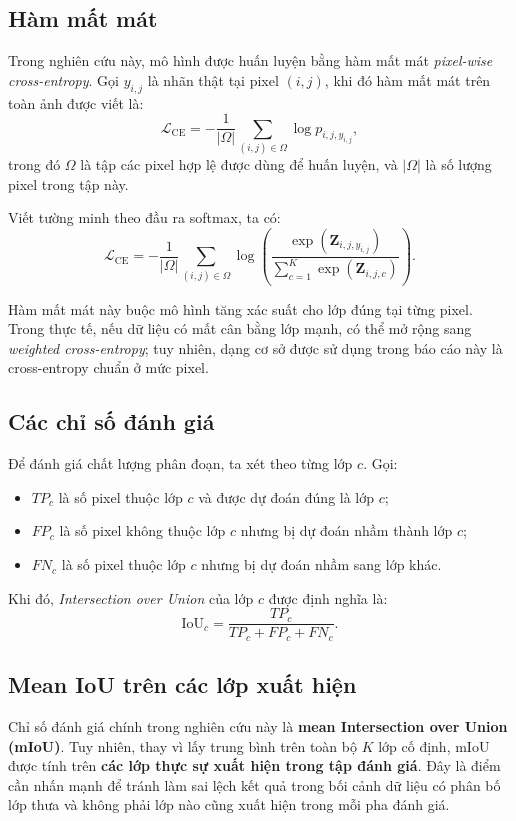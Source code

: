 \subsection{Hàm mất mát}

Trong nghiên cứu này, mô hình được huấn luyện bằng hàm mất mát \textit{pixel-wise cross-entropy}. Gọi $y_{i,j}$ là nhãn thật tại pixel $(i,j)$, khi đó hàm mất mát trên toàn ảnh được viết là:
\[
\mathcal{L}_{\mathrm{CE}}
=
-\frac{1}{|\Omega|}
\sum_{(i,j)\in\Omega}
\log p_{i,j,y_{i,j}},
\]
trong đó $\Omega$ là tập các pixel hợp lệ được dùng để huấn luyện, và $|\Omega|$ là số lượng pixel trong tập này.

Viết tường minh theo đầu ra softmax, ta có:
\[
\mathcal{L}_{\mathrm{CE}}
=
-\frac{1}{|\Omega|}
\sum_{(i,j)\in\Omega}
\log
\left(
\frac{\exp(\mathbf{Z}_{i,j,y_{i,j}})}
{\sum_{c=1}^{K}\exp(\mathbf{Z}_{i,j,c})}
\right).
\]

Hàm mất mát này buộc mô hình tăng xác suất cho lớp đúng tại từng pixel. Trong thực tế, nếu dữ liệu có mất cân bằng lớp mạnh, có thể mở rộng sang \textit{weighted cross-entropy}; tuy nhiên, dạng cơ sở được sử dụng trong báo cáo này là cross-entropy chuẩn ở mức pixel.

\subsection{Các chỉ số đánh giá}

Để đánh giá chất lượng phân đoạn, ta xét theo từng lớp $c$. Gọi:
\begin{itemize}[leftmargin=1.5em]
    \item $TP_c$ là số pixel thuộc lớp $c$ và được dự đoán đúng là lớp $c$;
    \item $FP_c$ là số pixel không thuộc lớp $c$ nhưng bị dự đoán nhầm thành lớp $c$;
    \item $FN_c$ là số pixel thuộc lớp $c$ nhưng bị dự đoán nhầm sang lớp khác.
\end{itemize}

Khi đó, \textit{Intersection over Union} của lớp $c$ được định nghĩa là:
\[
\mathrm{IoU}_c = \frac{TP_c}{TP_c + FP_c + FN_c}.
\]

\subsection{Mean IoU trên các lớp xuất hiện}

Chỉ số đánh giá chính trong nghiên cứu này là \textbf{mean Intersection over Union (mIoU)}. Tuy nhiên, thay vì lấy trung bình trên toàn bộ $K$ lớp cố định, mIoU được tính trên \textbf{các lớp thực sự xuất hiện trong tập đánh giá}. Đây là điểm cần nhấn mạnh để tránh làm sai lệch kết quả trong bối cảnh dữ liệu có phân bố lớp thưa và không phải lớp nào cũng xuất hiện trong mỗi pha đánh giá.

